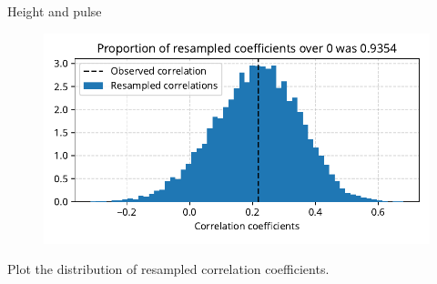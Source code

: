 \documentclass[12pt, aspectratio=149]{beamer}
\theoremstyle{plain}
\begin{document}
\begin{frame}[fragile]{Height and pulse}
\begin{center}
 \begin{figure}
    	\centering
    	\includegraphics[width=0.99\linewidth]{figures/height_pulse_coefs_binned.pdf}
 \end{figure}
 Plot the distribution of resampled correlation coefficients.
 \end{center}
\end{frame}
\end{document}
